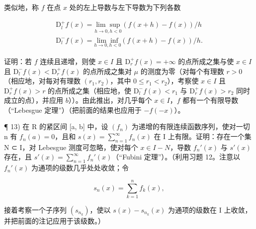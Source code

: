类似地，称 \(f\) 在点 \(x\) 处的左上导数与左下导数为下列各数

\[
\begin{array}{l}\mathrm{D} _ {l} ^ {+} f (x) = \underset {h \rightarrow 0, h <   0} {\lim \sup} \left(f (x + h) - f (x)\right) / h\\\mathrm{D} _ {l} ^ {-} f (x) = \underset {h \rightarrow 0, h <   0} {\lim \inf} \left(f (x + h) - f (x)\right) / h.\end{array}
\]

  证明：若 \(f\) 连续且递增，则使 \(x \in I\) 且 \(\mathrm{D}_r^+ f(x) = +\infty\) 的点所成之集与使 \(x \in I\) 且 \(\mathrm{D}_l^- f(x) < \mathrm{D}_r^+ f(x)\) 的点所成之集对 \(\mu\) 的测度为零（对每个有理数 \(r > 0\)（相应地，对每对有理数 \((r_1, r_2)\)，其中 \(0 \leqslant r_1 < r_2\)），考察使 \(x \in I\) 且 \(\mathrm{D}_r^+ f(x) > r\) 的点所成之集（相应地，使 \(\mathrm{D}_l^- f(x) < r_1\) 与 \(\mathrm{D}_r^+ f(x) > r_2\) 同时成立的点），并应用 \(b\)））。由此推出，对几乎每个 \(x \in I\)，\(f\) 都有一个有限导数（“Lebesgue 定理”）（把前面的结果也应用于 \(-f(-x)\)）。

¶ 13) 在 R 的紧区间 {[}a, b{]} 中，设 \((f_n)\) 为递增的有限连续函数序列，使对一切 n 有 \(f_n(a) = 0\)，且和 \(s(x) = \sum_{n=1}^{\infty} f_n(x)\) 在 I 上有限。证明：存在一个集 N ⊂ I，对 Lebesgue 测度可忽略，使对每个 \(x \in I - N\)，导数 \(f_n'(x)\) 与 \(s'(x)\) 存在，且 \(s'(x) = \sum_{n=1}^{\infty} f_n'(x)\)（“Fubini 定理”）。（利用习题 12。注意以 \(f_n'(x)\) 为通项的级数几乎处处收敛；令

\[
s _ {n} (x) = \sum_ {k = 1} ^ {n} f _ {k} (x),
\]

接着考察一个子序列 \((s_{n_k})\)，使以 \(s(x) - s_{n_k}(x)\) 为通项的级数在 I 上收敛，并把前面的注记应用于该级数。）

